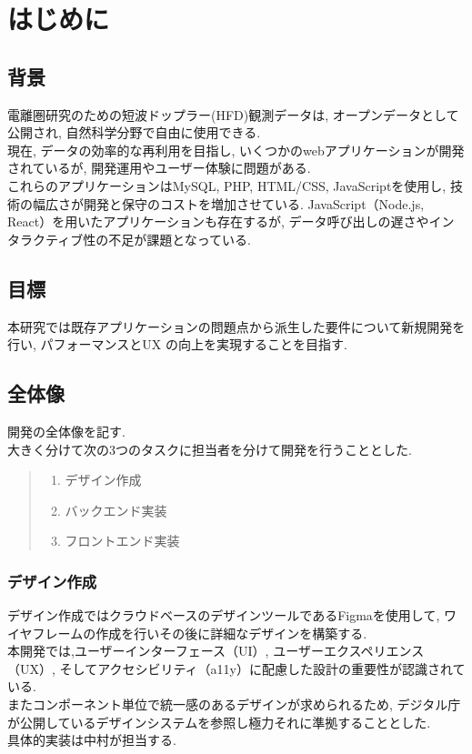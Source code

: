 \section{はじめに}
\subsection{背景}
電離圏研究のための短波ドップラー(HFD)観測データは, オープンデータとして公開され, 自然科学分野で自由に使用できる. \\
現在, データの効率的な再利用を目指し, いくつかのwebアプリケーションが開発されているが, 開発運用やユーザー体験に問題がある. \\
これらのアプリケーションはMySQL, PHP, HTML/CSS, JavaScriptを使用し, 技術の幅広さが開発と保守のコストを増加させている. 
JavaScript（Node.js, React）を用いたアプリケーションも存在するが, データ呼び出しの遅さやインタラクティブ性の不足が課題となっている. \cite{no1}

\subsection{目標}
本研究では既存アプリケーションの問題点から派生した要件について新規開発を行い,  パフォーマンスとUX の向上を実現することを目指す.

\subsection{全体像}
開発の全体像を記す.\\
大きく分けて次の3つのタスクに担当者を分けて開発を行うこととした.
\begin{quote}
	\begin{enumerate}
		\item デザイン作成
		\item バックエンド実装
		\item フロントエンド実装
	\end{enumerate}
\end{quote}

\subsubsection{デザイン作成}
デザイン作成ではクラウドベースのデザインツールであるFigmaを使用して, ワイヤフレームの作成を行いその後に詳細なデザインを構築する. \\
本開発では,ユーザーインターフェース（UI）, ユーザーエクスペリエンス（UX）, そしてアクセシビリティ（a11y）に配慮した設計の重要性が認識されている. \cite{no2} \\
またコンポーネント単位で統一感のあるデザインが求められるため, デジタル庁が公開しているデザインシステムを参照し極力それに準拠することとした.\cite{no3}\cite{no4}\\
具体的実装は中村が担当する.

